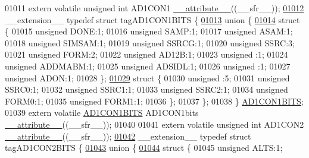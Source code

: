 \begin{DoxyCode}
01011 \textcolor{keyword}{extern} \textcolor{keyword}{volatile} \textcolor{keywordtype}{unsigned} \textcolor{keywordtype}{int}  AD1CON1 \hyperlink{a00009_a493c46f03454991ccc5aa7a6e1dfb2a7}{\_\_attribute\_\_}((\_\_sfr\_\_));
\hypertarget{a00009_source_l01012}{}\hyperlink{a00008}{01012} \_\_extension\_\_ \textcolor{keyword}{typedef} \textcolor{keyword}{struct }tagAD1CON1BITS \{
\hypertarget{a00009_source_l01013}{}\hyperlink{a00009}{01013}   \textcolor{keyword}{union }\{
\hypertarget{a00009_source_l01014}{}\hyperlink{a00009}{01014}     \textcolor{keyword}{struct }\{
01015       \textcolor{keywordtype}{unsigned} DONE:1;
01016       \textcolor{keywordtype}{unsigned} SAMP:1;
01017       \textcolor{keywordtype}{unsigned} ASAM:1;
01018       \textcolor{keywordtype}{unsigned} SIMSAM:1;
01019       \textcolor{keywordtype}{unsigned} SSRCG:1;
01020       \textcolor{keywordtype}{unsigned} SSRC:3;
01021       \textcolor{keywordtype}{unsigned} FORM:2;
01022       \textcolor{keywordtype}{unsigned} AD12B:1;
01023       \textcolor{keywordtype}{unsigned} :1;
01024       \textcolor{keywordtype}{unsigned} ADDMABM:1;
01025       \textcolor{keywordtype}{unsigned} ADSIDL:1;
01026       \textcolor{keywordtype}{unsigned} :1;
01027       \textcolor{keywordtype}{unsigned} ADON:1;
01028     \};
\hypertarget{a00009_source_l01029}{}\hyperlink{a00009}{01029}     \textcolor{keyword}{struct }\{
01030       \textcolor{keywordtype}{unsigned} :5;
01031       \textcolor{keywordtype}{unsigned} SSRC0:1;
01032       \textcolor{keywordtype}{unsigned} SSRC1:1;
01033       \textcolor{keywordtype}{unsigned} SSRC2:1;
01034       \textcolor{keywordtype}{unsigned} FORM0:1;
01035       \textcolor{keywordtype}{unsigned} FORM1:1;
01036     \};
01037   \};
01038 \} \hyperlink{a00008_d1/d09/a00077}{AD1CON1BITS};
01039 \textcolor{keyword}{extern} \textcolor{keyword}{volatile} \hyperlink{a00008_d1/d09/a00077}{AD1CON1BITS} AD1CON1bits \hyperlink{a00009_a493c46f03454991ccc5aa7a6e1dfb2a7}{\_\_attribute\_\_}((\_\_sfr\_\_));
01040 
01041 \textcolor{keyword}{extern} \textcolor{keyword}{volatile} \textcolor{keywordtype}{unsigned} \textcolor{keywordtype}{int}  AD1CON2 \hyperlink{a00009_a493c46f03454991ccc5aa7a6e1dfb2a7}{\_\_attribute\_\_}((\_\_sfr\_\_));
\hypertarget{a00009_source_l01042}{}\hyperlink{a00008}{01042} \_\_extension\_\_ \textcolor{keyword}{typedef} \textcolor{keyword}{struct }tagAD1CON2BITS \{
\hypertarget{a00009_source_l01043}{}\hyperlink{a00009}{01043}   \textcolor{keyword}{union }\{
\hypertarget{a00009_source_l01044}{}\hyperlink{a00009}{01044}     \textcolor{keyword}{struct }\{
01045       \textcolor{keywordtype}{unsigned} ALTS:1;

\end{DoxyCode}
